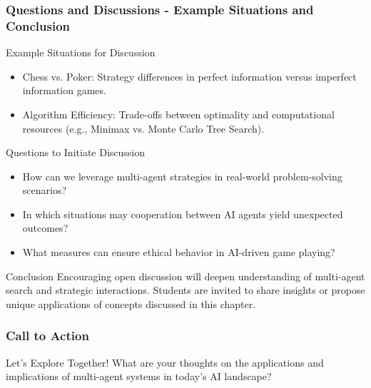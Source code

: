 \documentclass[aspectratio=169]{beamer}
\begin{document}
\begin{frame}[fragile]
    \frametitle{Questions and Discussions - Example Situations and Conclusion}
    \begin{block}{Example Situations for Discussion}
        \begin{itemize}
            \item Chess vs. Poker: Strategy differences in perfect information versus imperfect information games.
            \item Algorithm Efficiency: Trade-offs between optimality and computational resources (e.g., Minimax vs. Monte Carlo Tree Search).
        \end{itemize}
    \end{block}

    \begin{block}{Questions to Initiate Discussion}
        \begin{itemize}
            \item How can we leverage multi-agent strategies in real-world problem-solving scenarios?
            \item In which situations may cooperation between AI agents yield unexpected outcomes?
            \item What measures can ensure ethical behavior in AI-driven game playing?
        \end{itemize}
    \end{block}

    \begin{block}{Conclusion}
        Encouraging open discussion will deepen understanding of multi-agent search and strategic interactions. Students are invited to share insights or propose unique applications of concepts discussed in this chapter.
    \end{block}
\end{frame}

\begin{frame}[fragile]
    \frametitle{Call to Action}
    \begin{block}{Let's Explore Together!}
        What are your thoughts on the applications and implications of multi-agent systems in today's AI landscape?
    \end{block}
\end{frame}
\end{document}

